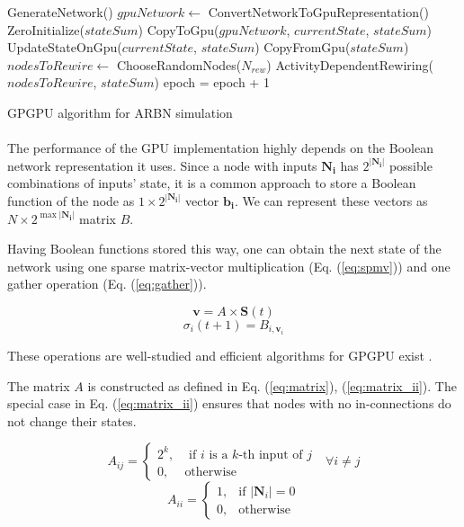 \documentclass[procedia]{easychair}
\begin{document}
	\begin{algorithm}[ht!]
		\label{algo:gpu}
		GenerateNetwork()\;
		{
			$gpuNetwork \leftarrow$ ConvertNetworkToGpuRepresentation()\;
			ZeroInitialize($stateSum$)\;
			CopyToGpu($gpuNetwork$, $currentState$, $stateSum$)\;
			{ 	
				UpdateStateOnGpu($currentState$, $stateSum$)\;
			}
			CopyFromGpu($stateSum$)\;
			$nodesToRewire \leftarrow$ ChooseRandomNodes($N_{rew}$)\;
			ActivityDependentRewiring($nodesToRewire$, $stateSum$)\;
			epoch = epoch + 1\;
		}
		\caption{GPGPU algorithm for ARBN simulation}
	\end{algorithm}

	\paragraph{} The performance of the GPU implementation highly depends on the Boolean network representation it uses. Since a node with inputs \(\mathbf{N_i}\) has \(2^{|\mathbf{N_i}|}\) possible combinations of inputs' state, it is a common approach to store a Boolean function of the node as \(1 \times 2^{|\mathbf{N_i}|}\) vector \(\mathbf{b_i}\). We can represent these vectors as \(N \times 2^{\max{|\mathbf{N_i}|}}\) matrix \(B\).
	
	Having Boolean functions stored this way, one can obtain the next state of the network using one sparse matrix-vector multiplication (Eq. (\ref{eq:spmv})) and one gather operation (Eq. (\ref{eq:gather})).
	
	\begin{equation}
	\label{eq:spmv}
		\mathbf{v} = A \times \mathbf{S}(t)
	\end{equation}
	\begin{equation}
	\label{eq:gather}
		\sigma_i(t+1) = B_{i, \mathbf{v}_i}
	\end{equation}
	
	These operations are well-studied and efficient algorithms for GPGPU exist \cite{bell2008efficient}\cite{he2007efficient}.
	
	The matrix \(A\) is constructed as defined in Eq. (\ref{eq:matrix}), (\ref{eq:matrix_ii}). The special case in Eq. (\ref{eq:matrix_ii}) ensures that nodes with no in-connections do not change their states.
	
	\begin{equation}
		\label{eq:matrix}
		A_{ij} = \begin{cases}
			2^k, & \mbox{ if } i\mbox{ is a } k \mbox{-th input of } j \\
			0, & \mbox{otherwise}
		\end{cases} \mbox{  } \forall i \neq j
	\end{equation}
	\begin{equation}
	\label{eq:matrix_ii}
	A_{ii} = \begin{cases}
		1, & \mbox{if } |\mathbf{N}_i|=0\\
		0, & \mbox{otherwise}
		\end{cases}
	\end{equation}
	
\end{document}
